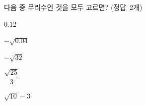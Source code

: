 다음 중 무리수인 것을 모두 고르면? \mbox{(정답 2개)}
\begin{choices32}{\rule[-3ex]{0pt}{8ex}$0.1\dot{2}$}{\rule[-3ex]{0pt}{8ex}$-\sqrt{0.04}$}{\rule[-3ex]{0pt}{8ex}$-\sqrt{32}$}{\rule[-3ex]{0pt}{8ex}$\dfrac{\sqrt{25}}{3}$}{\rule[-3ex]{0pt}{8ex}$\sqrt{10}-3$}\end{choices32}
